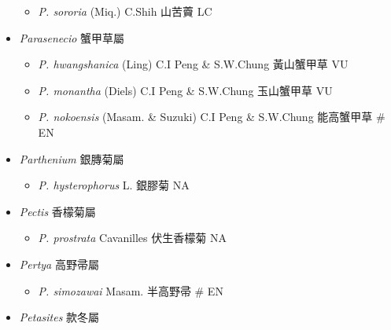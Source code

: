 \begin{itemize}
  \begin{itemize}
        \item[] \textit{P. sororia} (Miq.) C.Shih  山苦藚   LC
  \end{itemize}
 \item[] \textit{Parasenecio} 蟹甲草屬
                                
  \begin{itemize}
        \item[] \textit{P. hwangshanica} (Ling) C.I Peng \& S.W.Chung  黃山蟹甲草   VU
        \item[] \textit{P. monantha} (Diels) C.I Peng \& S.W.Chung  玉山蟹甲草   VU
        \item[] \textit{P. nokoensis} (Masam. \& Suzuki) C.I Peng \& S.W.Chung  能高蟹甲草  \# EN
  \end{itemize}
 \item[] \textit{Parthenium} 銀膞菊屬
                                
  \begin{itemize}
        \item[] \textit{P. hysterophorus} L.  銀膠菊   NA
  \end{itemize}
 \item[] \textit{Pectis} 香檬菊屬
                                
  \begin{itemize}
        \item[] \textit{P. prostrata} Cavanilles  伏生香檬菊   NA
  \end{itemize}
 \item[] \textit{Pertya} 高野帚屬
                                
  \begin{itemize}
        \item[] \textit{P. simozawai} Masam.  半高野帚  \# EN
  \end{itemize}
 \item[] \textit{Petasites} 款冬屬
                                

\end{itemize}
